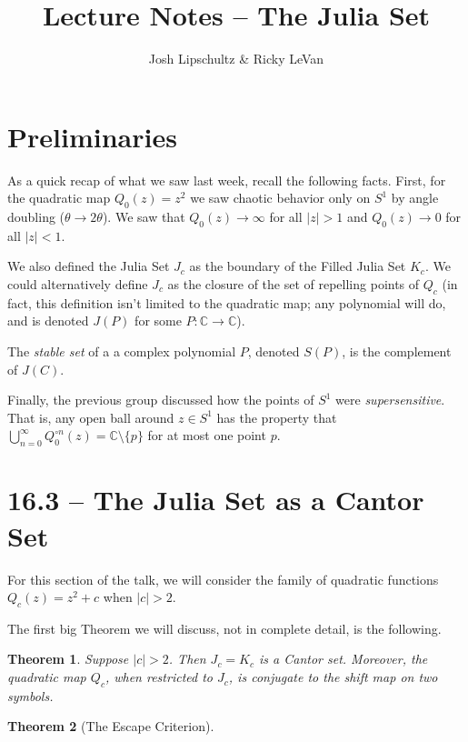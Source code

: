 \documentclass[symmetric]{tufte-handout}
\title{Lecture Notes -- The Julia Set}
\author{Josh Lipschultz \& Ricky LeVan}
\date{}  %
\newtheorem{theorem}{Theorem}
\begin{document}
\maketitle%

\section{Preliminaries}\label{sec:problem-1}

As a quick recap of what we saw last week, recall the following facts.
First, for the quadratic map $Q_0(z) = z^2$ we saw chaotic behavior only on $S^1$ by angle doubling ($\theta \rightarrow 2\theta$). We saw that $Q_0(z) \rightarrow \infty$ for all $|z| > 1$ and $Q_0(z) \rightarrow 0$ for all $|z| < 1$.

We also defined the Julia Set $J_c$ as the boundary of the Filled Julia Set $K_c$. We could alternatively define $J_c$ as the closure of the set of repelling points of $Q_c$ (in fact, this definition isn't limited to the quadratic map; any polynomial will do, and is denoted $J(P)$ for some $P: \mathbb{C} \rightarrow \mathbb{C}$).

The \textsl{stable set} of a a complex polynomial $P$, denoted $S(P)$, is the complement of $J(C)$.

Finally, the previous group discussed how the points of $S^1$ were \textsl{supersensitive}. That is, any open ball around $z \in S^1$ has the property that $\bigcup_{n=0}^\infty Q_0^{\circ n} (z) = \mathbb{C} \setminus \{p\}$ for at most one point $p$.


\section{16.3 -- The Julia Set as a Cantor Set}\label{sec:problem-1}

For this section of the talk, we will consider the family of quadratic functions 
$Q_c(z) = z^2 +c$ when $|c|>2$. 

The first big Theorem we will discuss, not in complete detail, is the following.

\begin{theorem}
Suppose $|c| > 2$. Then $J_c=K_c$ is a Cantor set. Moreover, the quadratic map $Q_c$, when restricted to $J_c$, is conjugate to the shift map on two symbols.
\end{theorem}


\begin{theorem}[The Escape Criterion]

\end{theorem}
\end{document}
